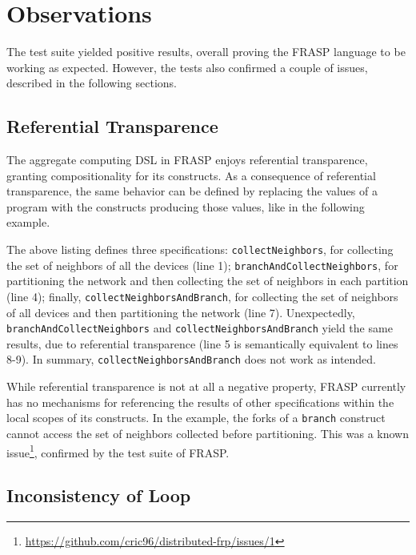 
\section{Observations}
\label{section:verification:observations}

The test suite yielded positive results, overall proving the FRASP language to
be working as expected. However, the tests also confirmed a couple of issues,
described in the following sections.

\subsection{Referential Transparence}

The aggregate computing \ac{DSL} in FRASP enjoys referential transparence,
granting compositionality for its constructs. As a consequence of referential
transparence, the same behavior can be defined by replacing the values of a
program with the constructs producing those values, like in the following
example.



The above listing defines three specifications: \texttt{collectNeighbors}, for
collecting the set of neighbors of all the devices (line 1);
\texttt{branchAndCollectNeighbors}, for partitioning the network and then
collecting the set of neighbors in each partition (line 4); finally,
\texttt{collectNeighborsAndBranch}, for collecting the set of neighbors of all
devices and then partitioning the network (line 7). Unexpectedly,
\texttt{branchAndCollectNeighbors} and \texttt{collectNeighborsAndBranch} yield
the same results, due to referential transparence (line 5 is semantically
equivalent to lines 8-9). In summary, \texttt{collectNeighborsAndBranch} does
not work as intended.

While referential transparence is not at all a negative property, FRASP
currently has no mechanisms for referencing the results of other specifications
within the local scopes of its constructs. In the example, the forks of a
\texttt{branch} construct cannot access the set of neighbors collected before
partitioning. This was a known issue\footnote{
\url{https://github.com/cric96/distributed-frp/issues/1}}, confirmed by the
test suite of FRASP.

\subsection{Inconsistency of Loop}

